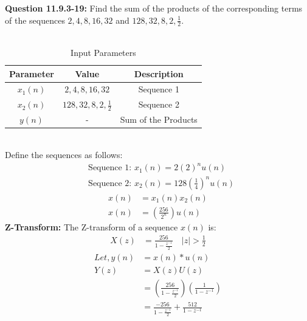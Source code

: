\documentclass[journal,12pt,twocolumn]{IEEEtran}
\theoremstyle{remark}
\begin{document}
\title{}
\author{Sasa Mardi, EE23BTECH11222}
\date{}
\maketitle
\textbf{Question 11.9.3-19:} Find the sum of the products of the corresponding terms of the sequences $2, 4, 8, 16, 32$ and $128, 32, 8, 2, \frac{1}{2}$.\\
\\
\solution
\fi
\begin{table}[h!]
    \centering
    \caption{Input Parameters}
    \label{tab.11.9.3.19:1}
    \begin{tabular}{ | c | c | c | }
        \hline
        Parameter & Value & Description \\
        \hline
        $x_1(n)$ & $2, 4, 8, 16, 32$ &  Sequence 1 \\
        \hline
        $x_2(n)$ & $128, 32, 8, 2, \frac{1}{2}$ &  Sequence 2 \\
        \hline
        $y(n)$ & - &  Sum of the Products \\
        \hline
    \end{tabular}
\end{table}\\
Define the sequences as follows:\\
\begin{align}
&\text{Sequence 1: } x_1(n) = 2(2)^nu(n) \\
&\text{Sequence 2: } x_2(n) = 128\left(\frac{1}{4}\right)^nu(n)
\end{align}
\begin{align}
x(n) &= x_1(n)x_2(n) \\
x(n) &= \left(\frac{256}{2^{n}}\right)u(n)
\end{align}
\textbf{Z-Transform:}
The Z-transform of a sequence \( x(n) \) is:
\begin{align}
X(z) &= \frac{256}{1 - \frac{z^{-1}}{2}}    \quad |z| > \frac{1}{2}
\end{align}
\begin{align}
Let, y(n) &= x(n)*u(n) \\
 Y(z) &= X(z)U(z) \\
 &= \left(\frac{256}{1 - \frac{z^{-1}}{2}}\right)\left(\frac{1}{1 - z^{-1}}\right)\\
 &= \frac{-256}{1 - \frac{z^{-1}}{2}} + \frac{512}{1 - z^{-1}}
\end{align}
\end{document}
